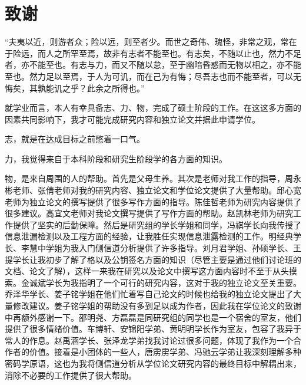 \chapter[致谢]{致\quad 谢}%

“夫夷以近，则游者众；险以远，则至者少。而世之奇伟、瑰怪，非常之观，常在于险远，而人之所罕至焉，故非有志者不能至也。有志矣，不随以止也，然力不足者，亦不能至也。有志与力，而又不随以怠，至于幽暗昏惑而无物以相之，亦不能至也。然力足以至焉，于人为可讥，而在己为有悔；尽吾志也而不能至者，可以无悔矣，其孰能讥之乎？此余之所得也。”

就学业而言，本人有幸具备志、力、物，完成了硕士阶段的工作。在这这多方面的因素共同影响下，我才可能完成研究内容和独立论文并据此申请学位。

志，就是在达成目标之前憋着一口气。

力，我觉得来自于本科阶段和研究生阶段学的各方面的知识。

物，是来自周围的人的帮助。首先是父母生养。其次是老师对我工作的指导，周永彬老师、张倩老师对我的研究内容、独立论文和学位论文提供了大量帮助。邱心宽老师为独立论文的撰写提供了很多写作方面的指导。陈佳哲老师为研究内容提供了很多建议。高宜文老师对我论文撰写提供了写作方面的帮助。赵凯林老师为研究工作提供了坚实的后勤保障。然后是研究组的学长学姐和同学，冯祺学长向我传授了信息泄漏检测以及工程方面的经验，让我胜任实现信息泄露检测的工作。明经典学长、李慧中学姐为我入门侧信道分析提供了许多指导。刘月君学姐、孙硕学长、王提学长让我初步了解了格以及公钥签名方面的知识（尽管主要是通过他们讨论班的文档、论文了解），这样一来我在研究以及论文中撰写这方面内容时不至于从头摸索。金诚斌学长为我指明了一个可行的研究内容，这对于我的独立论文至关重要。乔泽华学长、姜子铭学姐在他们忙着写自己论文的时候也给我的独立论文提出了大量修改建议。姜子铭学姐的帮助没有多到足以成为作者，因此我在学位论文的致谢中再额外感谢一下。邵明尧、方磊磊是同研究组的同学也是一个宿舍的室友，他们提供了很多情绪价值。车博轩、安锦阳学弟、黄明明学长作为室友，包容了我异于常人的作息。赵禹涵学长、张泽龙学弟找我讨论过很多问题，体现了我作为一个合作者的价值。接着是小团体的一些人，唐雳雳学弟、冯驰云学弟让我深刻理解多种密码学原语，这也为我将侧信道分析从学位论文研究内容的最终目标中解耦出来，消除不必要的工作提供了很大帮助。

